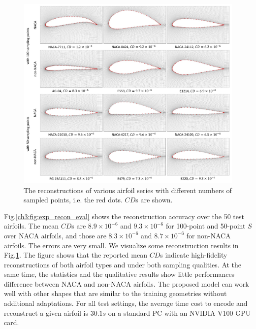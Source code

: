 \begin{figure}[!htb]
	\begin{center}
		\includegraphics[width=1\linewidth]{chapter3/tex/figures/experiment/reconstruction_result.pdf}
	\end{center}
	\caption{
		\small The reconstructions of various airfoil series with different numbers of sampled points, i.e. the red dots.
		$CD$s are shown.
	}
	\label{ch3:fig:exp_recon_res}
\end{figure}

Fig.\ref{ch3:fig:exp_recon_eval} shows the reconstruction accuracy over the 50 test airfoils.
The mean $CD$s are $8.9\times 10^{-6}$ and $9.3\times 10^{-6}$ for 100-point and 50-point $S$ over NACA airfoils, and those are $8.3\times 10^{-6}$ and $8.7\times 10^{-6}$ for non-NACA airfoils. The errors are very small. 
We visualize some reconstruction results in Fig.\ref{ch3:fig:exp_recon_res}.
The figure shows that the reported mean $CD$s indicate high-fidelity reconstructions of both airfoil types and under both sampling qualities.
At the same time, the statistics and the qualitative results show little performances difference between NACA and non-NACA airfoils.
The proposed model can work well with other shapes that are similar to the training geometries without additional adaptations.
For all test settings, the average time cost to encode and reconstruct a given airfoil is $30.1s$ on a standard PC with an NVIDIA V100 GPU card.